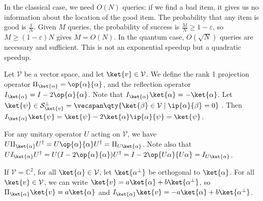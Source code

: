 In the classical case, we need $O(N)$ queries: if we find a bad item, it gives us no information about the location of the good item.
The probability that any item is good is $\frac{1}{N}$.
Given $M$ queries, the probability of success is $\frac{M}{N} \geq 1 - \varepsilon$, so $M \geq (1-\varepsilon)N$ gives $M = O(N)$.
In the quantum case, $O(\sqrt{N})$ queries are necessary and sufficient.
This is not an exponential speedup but a quadratic speedup.

Let $\mathcal V$ be a vector space, and let $\ket{v} \in \mathcal V$.
We define the rank 1 projection operator $\Pi_{\ket{\alpha}} = \op{\alpha}{\alpha}$, and the reflection operator $I_{\ket{\alpha}} = I - 2 \op{\alpha}{\alpha}$.
Note that $I_{\ket{\alpha}} \ket{\alpha} = - \ket{\alpha}$.
Let $\ket{\psi} \in \mathcal S_{\ket{v}}^\perp = \vecspan\qty{\ket{\beta} \in \mathcal V \mid \ip{\alpha}{\beta} = 0}$ .
Then $I_{\ket{\alpha}} \ket{\psi} = \ket{\psi} - 2\ket{\alpha}\ip{\alpha}{\psi} = \ket{\psi}$.

For any unitary operator $U$ acting on $\mathcal V$, we have $U \Pi_{\ket{\alpha}} U^\dagger = U \op{\alpha}{\alpha} U^\dagger = \Pi_{U\ket{\alpha}}$.
Note also that $U I_{\ket{\alpha}} U^\dagger = U(I - 2 \op{\alpha}{\alpha}) U^\dagger = I - 2 \op{U\alpha}{U\alpha} = I_{U\ket{\alpha}}$.

If $\mathcal V = \mathbb C^2$, for all $\ket{\alpha} \in \mathcal V$, let $\ket{\alpha^\perp}$ be orthogonal to $\ket{\alpha}$.
For all $\ket{v} \in \mathcal V$, we can write $\ket{v} = a \ket{\alpha} + b \ket{\alpha^\perp}$, so $\Pi_{\ket{\alpha}} \ket{v} = a \ket{\alpha}$ and $I_{\ket{\alpha}} \ket{v} = -a\ket{\alpha} + b \ket{\alpha^\perp}$.

